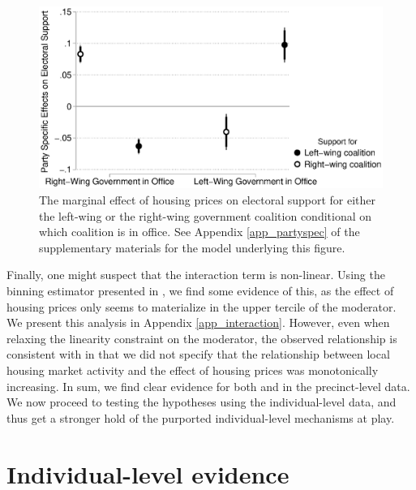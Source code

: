 \documentclass[12pt,a4paper]{article}
\begin{document}
	\begin{figure}
		\includegraphics[width=1\textwidth]{../figures/partyspecific.eps}
		\caption{The marginal effect of housing prices on electoral support for either the left-wing or the right-wing government coalition conditional on which coalition is in office. See Appendix \ref{app_partyspec} of the supplementary materials for the model underlying this figure.}
		\label {partyspecific}
	\end{figure}
	
	Finally, one might suspect that the interaction term is non-linear. Using the binning estimator presented in \cite{hainmueller2016much}, we find some evidence of this, as the effect of housing prices only seems to materialize in the upper tercile of the moderator. We present this analysis in Appendix \ref{app_interaction}. However, even when relaxing the linearity constraint on the moderator, the observed relationship is consistent with \htwo in that we did not specify that the relationship between local housing market activity and the effect of housing prices was monotonically increasing. 
	In sum, we find clear evidence for both \hone and \htwo in the precinct-level data. We now proceed to testing the hypotheses using the individual-level data, and thus get a stronger hold of the purported individual-level mechanisms at play.
	
	\section{Individual-level evidence}
	
\end{document}
